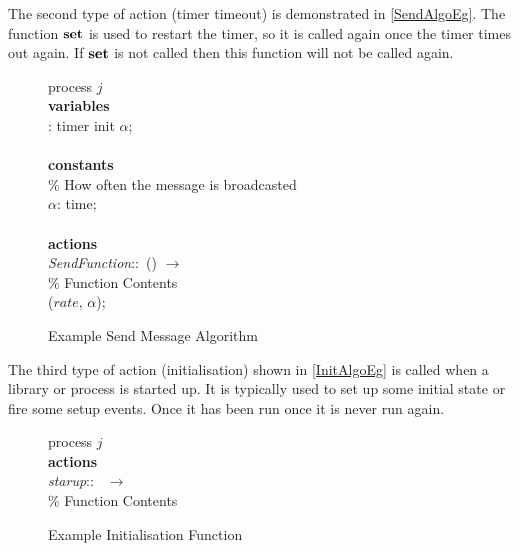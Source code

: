 The second type of action (timer timeout) is demonstrated in \autoref{SendAlgoEg}. The function $\mbox{\textbf{set}}$ is used to restart the timer, so it is called again once the timer times out again. If $\mbox{\textbf{set}}$ is not called then this function will not be called again.

\begin{figure}[H]
  \centering
  \begin{boxedminipage}{\linewidth}
    \null process $j$\\
    \null \textbf{variables}\\
    \null\qq {}: timer init $\alpha$;\\~\\
    \null \textbf{constants}\\
    \null\qq \% How often the message is broadcasted\\
    \null\qq $\alpha$: time;\\~\\
    \null \textbf{actions}\\
    \null\qq \emph{SendFunction}::~() $\rightarrow$\\
    \null\qq\qq \% Function Contents\\
    \null\qq\qq {}($\mathit{rate}$, $\alpha$); \\
  \end{boxedminipage}
  \caption{Example Send Message Algorithm}
  \label{SendAlgoEg}
\end{figure}

The third type of action (initialisation) shown in \autoref{InitAlgoEg} is called when a library or process is started up. It is typically used to set up some initial state or fire some setup events. Once it has been run once it is never run again.

\begin{figure}[H]
  \centering
  \begin{boxedminipage}{\linewidth}
    \null process $j$\\
    \null \textbf{actions}\\
    \null\qq \emph{starup}::~ $\rightarrow$\\
    \null\qq\qq \% Function Contents\\
  \end{boxedminipage}
  \caption{Example Initialisation Function}
  \label{InitAlgoEg}
\end{figure}

